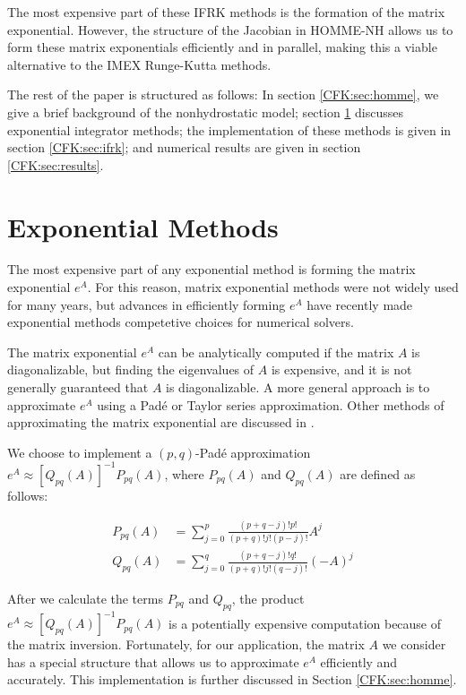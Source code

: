 \documentclass{csri19}
\begin{document}
The most expensive part of these IFRK methods is the formation of the 
matrix exponential. However, the structure of the Jacobian in HOMME-NH 
allows us to form these matrix exponentials efficiently and in parallel, 
making this a viable alternative to the IMEX Runge-Kutta methods.

The rest of the paper is structured as follows: In section 
\ref{CFK:sec:homme}, we give a brief background of the nonhydrostatic 
model; section \ref{CFK:sec:matexp} discusses exponential integrator 
methods; the implementation of these methods is given in section 
\ref{CFK:sec:ifrk}; and numerical results are given in section 
\ref{CFK:sec:results}.

\section{Exponential Methods}\label{CFK:sec:matexp} 
The most expensive part of any exponential method is forming the matrix 
exponential $e^A$. For this reason, matrix exponential methods were not 
widely used for many years, but advances in efficiently forming $e^A$ have 
recently made exponential methods competetive choices for numerical solvers.

The matrix exponential $e^A$ can be analytically computed if the matrix $A$
 is diagonalizable, but finding the eigenvalues of $A$ is expensive, and it
 is not generally guaranteed that $A$ is diagonalizable. A more general 
approach is to approximate $e^{A}$ using a Pad\'e or Taylor series 
approximation. Other methods of approximating the matrix exponential are 
discussed in \cite{CFK:Moler2003}.

We choose to implement a $(p,q)$-Pad\'e approximation 
$e^{A}\approx \left[Q_{pq}(A)\right]^{-1}P_{pq}(A)$, where $P_{pq}(A)$ and 
$Q_{pq}(A)$ are defined as follows:

\begin{align*}
P_{pq}(A) &= \sum_{j=0}^p\frac{(p+q-j)!p!}{(p+q)!j!(p-j)!}A^j\\
Q_{pq}(A) &= \sum_{j=0}^q\frac{(p+q-j)!q!}{(p+q)!j!(q-j)!}(-A)^j
\end{align*}

After we calculate the terms $P_{pq}$ and $Q_{pq}$, the product 
$e^A\approx\left[Q_{pq}(A)\right]^{-1}P_{pq}(A)$ is a potentially 
expensive computation because of the matrix inversion. Fortunately, for our
 application, the matrix $A$ we consider has a special structure that allows
us to approximate $e^A$ efficiently and accurately. This implementation is 
further discussed in Section \ref{CFK:sec:homme}.
\end{document}
